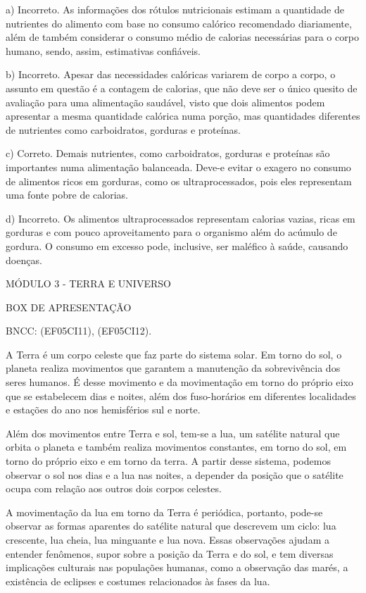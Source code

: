 a) Incorreto. As informações dos rótulos nutricionais estimam a
quantidade de nutrientes do alimento com base no consumo calórico
recomendado diariamente, além de também considerar o consumo médio de
calorias necessárias para o corpo humano, sendo, assim, estimativas
confiáveis.

b) Incorreto. Apesar das necessidades calóricas variarem de corpo a
corpo, o assunto em questão é a contagem de calorias, que não deve ser o
único quesito de avaliação para uma alimentação saudável, visto que dois
alimentos podem apresentar a mesma quantidade calórica numa porção, mas
quantidades diferentes de nutrientes como carboidratos, gorduras e
proteínas.

c) Correto. Demais nutrientes, como carboidratos, gorduras e proteínas
são importantes numa alimentação balanceada. Deve-e evitar o exagero no
consumo de alimentos ricos em gorduras, como os ultraprocessados, pois
eles representam uma fonte pobre de calorias.

d) Incorreto. Os alimentos ultraprocessados representam calorias vazias,
ricas em gorduras e com pouco aproveitamento para o organismo além do
acúmulo de gordura. O consumo em excesso pode, inclusive, ser maléfico à
saúde, causando doenças.

\protect\hypertarget{_q79ien7oogpf}{}{}MÓDULO 3 - TERRA E UNIVERSO

BOX DE APRESENTAÇÃO

BNCC: (EF05CI11), (EF05CI12).

A Terra é um corpo celeste que faz parte do sistema solar. Em torno do
sol, o planeta realiza movimentos que garantem a manutenção da
sobrevivência dos seres humanos. É desse movimento e da movimentação em
torno do próprio eixo que se estabelecem dias e noites, além dos
fuso-horários em diferentes localidades e estações do ano nos
hemisférios sul e norte.

Além dos movimentos entre Terra e sol, tem-se a lua, um satélite natural
que orbita o planeta e também realiza movimentos constantes, em torno do
sol, em torno do próprio eixo e em torno da terra. A partir desse
sistema, podemos observar o sol nos dias e a lua nas noites, a depender
da posição que o satélite ocupa com relação aos outros dois corpos
celestes.

A movimentação da lua em torno da Terra é periódica, portanto, pode-se
observar as formas aparentes do satélite natural que descrevem um ciclo:
lua crescente, lua cheia, lua minguante e lua nova. Essas observações
ajudam a entender fenômenos, supor sobre a posição da Terra e do sol, e
tem diversas implicações culturais nas populações humanas, como a
observação das marés, a existência de eclipses e costumes relacionados
às fases da lua.

